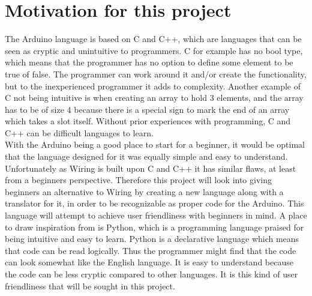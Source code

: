 \section{Motivation for this project}\label{introduction:motivation}
The Arduino language is based on C and C++, which are languages that can be seen as cryptic and unintuitive to programmers. C for example has no bool type, which means that the programmer has no option to define some element to be true of false. The programmer can work around it and/or create the functionality, but to the inexperienced programmer it adds to complexity. Another example of C not being intuitive is when creating an array to hold 3 elements, and the array has to be of size 4 because there is a special sign to mark the end of an array which takes a slot itself.  Without prior experiences with programming, C and C++ can be difficult languages to learn. \\

With the Arduino being a good place to start for a beginner, it would be optimal that the language designed for it was equally simple and easy to understand. Unfortunately as Wiring is built upon C and C++ it has similar flaws, at least from a beginners perspective. Therefore this project will look into giving beginners an alternative to Wiring by creating a new language along with a translator for it, in order to be recognizable as proper code for the Arduino. This language will attempt to achieve user friendliness with beginners in mind. A place to draw inspiration from is Python, which is a programming language praised for being intuitive and easy to learn.  Python is a declarative language which means that code can be read logically.  Thus the programmer might find that the code can look somewhat like the English language. It is easy to understand because the code can be less cryptic compared to other languages. It is this kind of user friendliness that will be sought in this project.